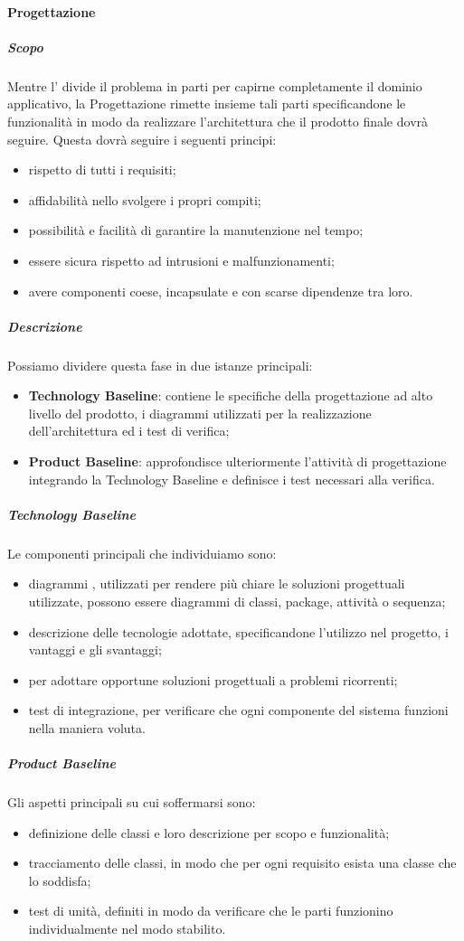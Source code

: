 			\paragraph{Progettazione}
			\subparagraph{Scopo}
			Mentre l' divide il problema in parti per capirne completamente il dominio applicativo, la Progettazione rimette insieme tali parti specificandone le funzionalità in modo da realizzare l'architettura che il prodotto finale dovrà seguire. Questa dovrà seguire i seguenti principi:
			\begin{itemize}
				\item rispetto di tutti i requisiti;
				\item affidabilità nello svolgere i propri compiti;
				\item possibilità e facilità di garantire la manutenzione nel tempo;
				\item essere sicura rispetto ad intrusioni e malfunzionamenti;
				\item avere componenti coese, incapsulate e con scarse dipendenze tra loro.
			\end{itemize}
			\subparagraph{Descrizione}
			Possiamo dividere questa fase in due istanze principali:
			\begin{itemize}
				\item \textbf{Technology Baseline}: contiene le specifiche della progettazione ad alto livello del prodotto, i diagrammi  utilizzati per la realizzazione dell'architettura ed i test di verifica;
				\item \textbf{Product Baseline}: approfondisce ulteriormente l'attività di progettazione integrando la Technology Baseline e definisce i test necessari alla verifica.
			\end{itemize}
			\subparagraph{Technology Baseline}
			Le componenti principali che individuiamo sono:
			\begin{itemize}
				\item diagrammi , utilizzati per rendere più chiare le soluzioni progettuali utilizzate, possono essere diagrammi di classi, package, attività o sequenza;
				\item descrizione delle tecnologie adottate, specificandone l'utilizzo nel progetto, i vantaggi e gli svantaggi;
				\item {} per adottare opportune soluzioni progettuali a problemi ricorrenti;
				\item test di integrazione, per verificare che ogni componente del sistema funzioni nella maniera voluta.
			\end{itemize}
			\subparagraph{Product Baseline}
			Gli aspetti principali su cui soffermarsi sono:
			\begin{itemize}
				\item definizione delle classi e loro descrizione per scopo e funzionalità;
				\item tracciamento delle classi, in modo che per ogni requisito esista una classe che lo soddisfa;
				\item test di unità, definiti in modo da verificare che le parti funzionino individualmente nel modo stabilito.
			\end{itemize}

